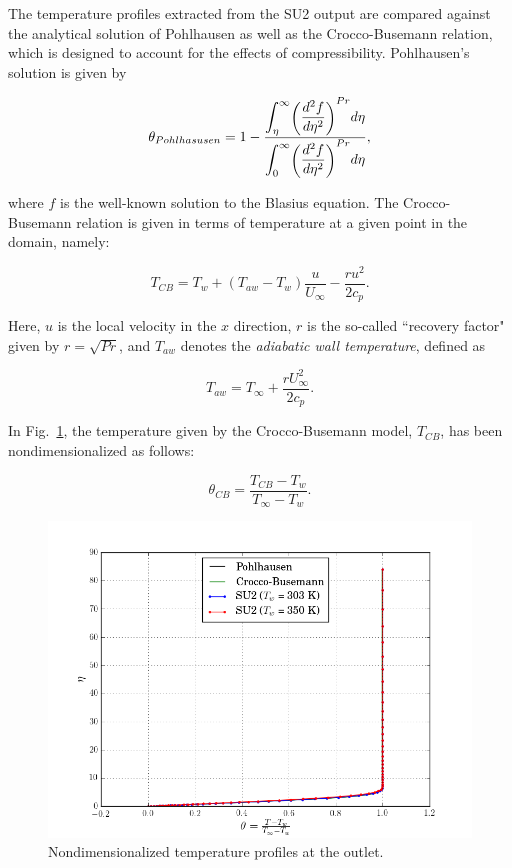 \documentclass[12pt,letterpaper]{article}
\begin{document}
The temperature profiles extracted from the SU2 output are compared against the analytical solution of Pohlhausen as well as the Crocco-Busemann relation, which is designed to account for the effects of compressibility. Pohlhausen's solution is given by

\begin{equation*}
\theta_{Pohlhasusen} = 1 - \dfrac{\mathlarger{\int_{\eta}^{\infty}}\mathsmaller{\left( \dfrac{d^2f}{d\eta^2}\right)}^{Pr}d\eta}{\mathlarger{\int_{0}^{\infty}}\mathsmaller{\left( \dfrac{d^2f}{d\eta^2}\right)}^{Pr}d\eta},
\end{equation*}

where $f$ is the well-known solution to the Blasius equation. The Crocco-Busemann relation is given in terms of temperature at a given point in the domain, namely:

\begin{equation*}
T_{CB} = T_w + \left( T_{aw}-T_w \right)\frac{u}{U_\infty} - \dfrac{ru^2}{2c_p}.
\end{equation*}

Here, $u$ is the local velocity in the $x$ direction, $r$ is the so-called ``recovery factor" given by $r = \sqrt{Pr}$, and $T_{aw}$ denotes the \textit{adiabatic wall temperature}, defined as

\begin{equation*}
T_{aw} = T_\infty + \dfrac{rU_\infty^2}{2c_p}.
\end{equation*}

In Fig.~\ref{fig:temp}, the temperature given by the Crocco-Busemann model, $T_{CB}$, has been nondimensionalized as follows:

\begin{equation*}
\theta_{CB} = \dfrac{T_{CB}-T_w}{T_\infty-T_w}.
\end{equation*}

\begin{figure}[h] 
\centering
\includegraphics[width=\linewidth]{temp.png}
\caption{Nondimensionalized temperature profiles at the outlet.}
\label{fig:temp}
\end{figure}
\end{document}
